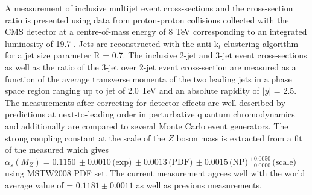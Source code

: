 A measurement of inclusive multijet event cross-sections and the cross-section ratio is presented using data from proton-proton collisions collected with the CMS detector at a centre-of-mass energy of 8 TeV corresponding to an integrated luminosity of 19.7 \fbinv. Jets are reconstructed with the anti-k$_t$ clustering algorithm for a jet size parameter R = 0.7. The inclusive 2-jet and 3-jet event cross-sections as well as the ratio of the 3-jet over 2-jet event cross-section \ratio are measured as a function of the average transverse momenta \pt of the two leading jets in a phase space region ranging up to jet \pt of 2.0 TeV and an absolute rapidity of $|y|$ = 2.5. The measurements after correcting for detector effects are well described by predictions at next-to-leading order in perturbative quantum chromodynamics and additionally are compared to several Monte Carlo event generators. The strong coupling constant at the scale of the $Z$ boson mass is extracted from a fit of the measured \ratio which gives $\alpha_s(M_Z) = 0.1150\,\pm0.0010\,\textrm{(exp)}\,\pm0.0013\,\textrm{(PDF)}\, \pm0.0015\,\textrm{(NP)}\,^{+0.0050}_{-0.0000}\,\textrm{(scale)}$ using MSTW2008 PDF set. The current measurement agrees well with the world average value of \alpsmz = $0.1181 \pm 0.0011$ as well as previous measurements.
